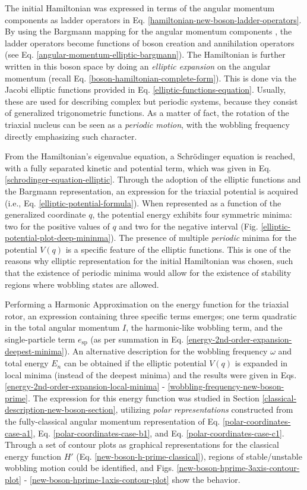 The initial Hamiltonian was expressed in terms of the angular momentum components as ladder operators in Eq. \ref{hamiltonian-new-boson-ladder-operators}. By using the Bargmann mapping for the angular momentum components \cite{bargmann1962representations}, the ladder operators become functions of boson creation and annihilation operators (see Eq. \ref{angular-momentum-elliptic-bargmann}). The Hamiltonian is further written in this boson space by doing an \emph{elliptic expansion} on the angular momentum (recall Eq. \ref{boson-hamiltonian-complete-form}). This is done via the Jacobi elliptic functions provided in Eq. \ref{elliptic-functions-equation}. Usually, these are used for describing complex but periodic systems, because they consist of generalized trigonometric functions. As a matter of fact, the rotation of the triaxial nucleus can be seen as a \emph{periodic motion}, with the wobbling frequency directly emphasizing such character.

From the Hamiltonian's eigenvalue equation, a Schrödinger equation is reached, with a fully separated kinetic and potential term, which was given in Eq. \ref{schrodinger-equation-elliptic}. Through the adoption of the elliptic functions and the Bargmann representation, an expression for the triaxial potential is acquired (i.e., Eq. \ref{elliptic-potential-formula}). When represented as a function of the generalized coordinate $q$, the potential energy exhibits four symmetric minima: two for the positive values of $q$ and two for the negative interval (Fig. \ref{elliptic-potential-plot-deep-mininma}). The presence of multiple \emph{periodic} minima for the potential $V(q)$ is a specific feature of the elliptic functions. This is one of the reasons why elliptic representation for the initial Hamiltonian was chosen, such that the existence of periodic minima would allow for the existence of stability regions where wobbling states are allowed.

Performing a Harmonic Approximation on the energy function for the triaxial rotor, an expression containing three specific terms emerges; one term quadratic in the total angular momentum $I$, the harmonic-like wobbling term, and the single-particle term $e_\text{sp}$ (as per summation in Eq. \ref{energy-2nd-order-expansion-deepest-minima}). An alternative description for the wobbling frequency $\omega$ and total energy $E_n$ can be obtained if the elliptic potential $V(q)$ is expanded in local minima (instead of the deepest minima) and the results were given in Eqs. \ref{energy-2nd-order-expansion-local-minima} - \ref{wobbling-frequency-new-boson-prime}. The expression for this energy function was studied in Section \ref{classical-description-new-boson-section}, utilizing \emph{polar representations} constructed from the fully-classical angular momentum representation of Eq. \ref{polar-coordinates-case-a1}, Eq. \ref{polar-coordinates-case-b1}, and Eq. \ref{polar-coordinates-case-c1}. Through a set of contour plots as graphical representations for the classical energy function $H'$ (Eq. \ref{new-boson-h-prime-classical}), regions of stable/unstable wobbling motion could be identified, and Figs. \ref{new-boson-hprime-3axis-contour-plot} - \ref{new-boson-hprime-1axis-contour-plot} show the behavior.

